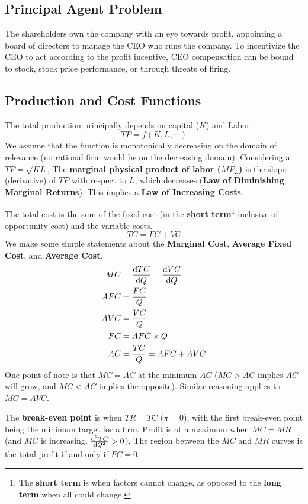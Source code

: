 \documentclass{article}
\begin{document}
\subsection{Principal Agent Problem}
The shareholders own the company with an eye towards profit, appointing a board of directors to manage the CEO who runs the company. To incentivize the CEO to act according to the profit incentive, CEO compensation can be bound to stock, stock price performance, or through threats of firing.

\subsection{Production and Cost Functions}
The total production principally depends on capital ($K$) and Labor.
\[
    TP=f(K, L, \cdots)
\]
We assume that the function is monotonically decreasing on the domain of relevance (no rational firm would be on the decreasing domain). Considering a $TP = \sqrt{KL}$, The \textbf{marginal physical product of labor ($MP_L$)}  is the slope (derivative) of $TP$ with respect to $L$, which decreases (\textbf{Law of Diminishing Marginal Returns}). This implies a \textbf{Law of Increasing Costs}.

The total cost is the sum of the fixed cost (in the \textbf{short term}\footnote{The \textbf{short term} is when factors cannot change, as opposed to the \textbf{long term} when all could change.} inclusive of opportunity cost) and the variable costs.
\[
    TC=FC+VC
\]
We make some simple statements about the \textbf{Marginal Cost}, \textbf{Average Fixed Cost}, and \textbf{Average Cost}.
\begin{align*}
    MC &= \dv{TC}{Q} = \dv{VC}{Q}\\
	AFC &= \frac{FC}{Q}\\
	AVC &= \frac{VC}{Q}\\
	FC &= AFC \times Q\\
	AC &= \frac{TC}{Q} = AFC + AVC\\
\end{align*}
One point of note is that $MC=AC$ at the minimum $AC$ ($MC>AC$ implies $AC$ will grow, and $MC<AC$ implies the opposite). Similar reasoning applies to $MC=AVC$.

The \textbf{break-even point} is when $TR=TC$ ($\pi=0$), with the first break-even point being the minimum target for a firm. Profit is at a maximum when $MC=MR$ (and $MC$ is increasing, $\dv[2]{TC}{Q}>0$). The region between the $MC$ and $MR$ curves is the total profit if and only if $FC=0$.
\end{document}
